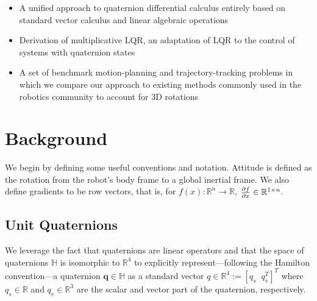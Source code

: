 \documentclass[letterpaper, 10 pt, conference]{ieeeconf}  %
\newcommand{\R}{\mathbb{R}}
\newcommand{\q}{\textbf{q}}
\begin{document}
    \begin{itemize}
        \item A unified approach to quaternion differential calculus entirely based on standard vector calculus and linear algebraic operations
        \item Derivation of multiplicative LQR, an adaptation of LQR to the control of systems with quaternion states
        \item A set of benchmark motion-planning and trajectory-tracking problems in which we compare our approach to existing methods commonly used in the robotics community to account for 3D rotations
    \end{itemize}


\section{Background}

    We begin by defining some useful conventions and notation. 
    Attitude is defined as the rotation from the robot's body frame to a global inertial 
        frame. 
    We also define gradients to be row vectors, that is, for 
        $f(x) : \R^n \to \R$, $\pdv{f}{x} \in \R^{1\times n}$.

    \subsection{Unit Quaternions} \label{sec:quaternions}
        We leverage the fact that quaternions are linear operators and that the space of 
        quaternions $\mathbb{H}$ is isomorphic to $\R^4$ to explicitly 
        represent---following the Hamilton convention---a quaternion $\q \in \mathbb{H}$ as 
        a standard vector $q \in \R^4 := [q_s \;\; q_v^T]^T$ where $q_s \in \R$ and 
        $q_v \in \R^3$ are the scalar and vector part of the quaternion, respectively.
        
\end{document}
